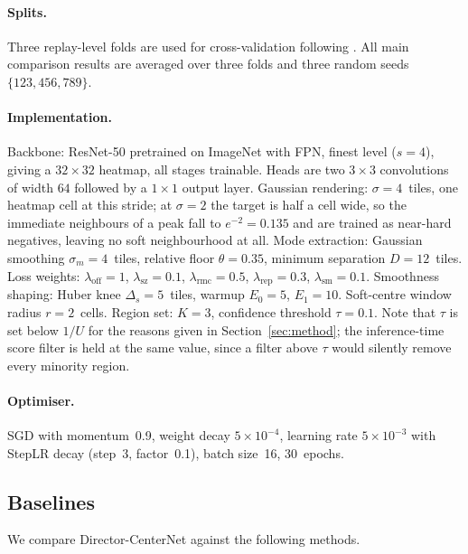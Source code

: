 \documentclass[preprint,12pt]{elsarticle}
\begin{document}
\paragraph{Splits.} Three replay-level folds are used for cross-validation 
following \cite{joo2023learning, anonymous2025kbrs}. All main comparison 
results are averaged over three folds and three random seeds 
$\{123, 456, 789\}$.

\paragraph{Implementation.} Backbone: ResNet-50 pretrained on ImageNet with
FPN, finest level ($s=4$), giving a $32 \times 32$ heatmap, all stages
trainable. Heads are two $3{\times}3$ convolutions of width $64$ followed by a
$1{\times}1$ output layer. Gaussian rendering: $\sigma = 4$~tiles, one heatmap
cell at this stride; at $\sigma = 2$ the target is half a cell wide, so the
immediate neighbours of a peak fall to $e^{-2} = 0.135$ and are trained as
near-hard negatives, leaving no soft neighbourhood at all. Mode extraction:
Gaussian smoothing
$\sigma_m = 4$~tiles, relative floor $\theta = 0.35$, minimum separation
$D = 12$~tiles. Loss weights: $\lambda_{\text{off}}=1$,
$\lambda_{\text{sz}}=0.1$, $\lambda_{\text{rmc}}=0.5$,
$\lambda_{\text{rep}}=0.3$, $\lambda_{\text{sm}}=0.1$. Smoothness shaping:
Huber knee $\Delta_s = 5$~tiles, warmup $E_0 = 5$, $E_1 = 10$. Soft-centre
window radius $r=2$~cells. Region set: $K=3$, confidence threshold
$\tau=0.1$. Note that $\tau$ is set below $1/U$ for the reasons given in
Section~\ref{sec:method}; the inference-time score filter is held at the same
value, since a filter above $\tau$ would silently remove every minority
region.

\paragraph{Optimiser.} SGD with momentum~0.9, weight decay $5{\times}10^{-4}$, 
learning rate $5{\times}10^{-3}$ with StepLR decay (step~3, factor~0.1), 
batch size~16, 30~epochs.

\subsection{Baselines}

We compare Director-CenterNet against the following methods.
\end{document}
